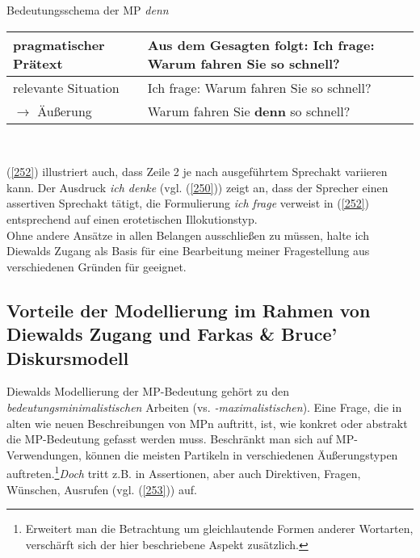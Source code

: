 \begin{exe}
	\ex\label{252} Bedeutungsschema der MP \textit{denn}\\[-0.5em]
     \begin{tabular}[t]{|l|p{7cm}|}
     	\hline
      	pragmatischer Prätext & Aus dem Gesagten folgt: Ich frage: Warum fahren Sie so schnell?\\
        \hline
        relevante Situation & Ich frage: Warum fahren Sie so schnell?\\
        \hline
        $\rightarrow$ Äußerung & Warum fahren Sie \textbf{denn} so schnell?\\
        \hline
     \end{tabular}\\
     \hbox{}\hfill\hbox{\citet[136]{Diewald2007}}
\end{exe}
(\ref{252}) illustriert auch, dass Zeile 2 je nach ausgeführtem Sprechakt variieren kann. Der Ausdruck \textit{ich denke} (vgl. (\ref{250})) zeigt an, dass der Sprecher einen assertiven Sprechakt  tätigt, die Formulierung \textit{ich frage} verweist in (\ref{252}) entsprechend auf  einen erotetischen Illokutionstyp.\\

\noindent
Ohne andere Ansätze in allen Belangen ausschließen zu müssen, halte ich Diewalds Zugang als Basis für eine Bearbeitung meiner Fragestellung aus verschiedenen Gründen für geeignet. 

\subsection{Vorteile der Modellierung im Rahmen von Diewalds Zugang und Farkas \& Bruce' Diskursmodell}
\label{sec:vorteile}
Diewalds Modellierung der MP-Bedeutung gehört zu den \textit{bedeutungsminimalisti\-schen}  Arbeiten (vs. \textit{-maximalistischen}). Eine Frage, die in alten wie neuen Beschreibungen von MPn auftritt, ist, wie konkret oder abstrakt die MP-Bedeutung gefasst werden muss. Beschränkt man sich auf MP-Verwendungen, können die meisten Partikeln in verschiedenen Äußerungstypen auftreten.\footnote{Erweitert man die Betrachtung um gleichlautende Formen anderer Wortarten, verschärft sich der hier beschriebene Aspekt zusätzlich.}\textit{Doch} tritt z.B. in Assertionen, aber auch Direktiven, Fragen, Wünschen, Ausrufen (vgl. (\ref{253})) auf.

